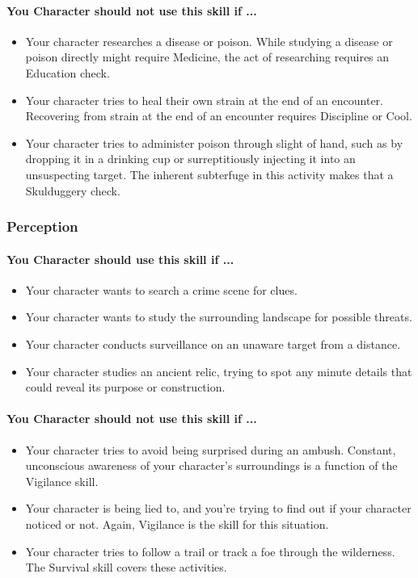 \begin{multicols}{2}
\paragraph{You Character should not use this skill if ...}
\begin{itemize}
    \item Your character researches a disease or poison. While studying a disease
        or poison directly might require Medicine, the act of researching requires
        an Education check.
    \item Your character tries to heal their own strain at the end of an encounter.
        Recovering from strain at the end of an encounter requires Discipline or Cool.
    \item Your character tries to administer poison through slight of hand, such
        as by dropping it in a drinking cup or surreptitiously injecting it into
        an unsuspecting target. The inherent subterfuge in this activity makes
        that a Skulduggery check.
\end{itemize}

\subsubsection{Perception}\label{skill:perception}
\paragraph{You Character should use this skill if ...}
\begin{itemize}
    \item Your character wants to search a crime scene for clues.
    \item Your character wants to study the surrounding landscape for possible
        threats.
    \item Your character conducts surveillance on an unaware target from a
        distance.
    \item Your character studies an ancient relic, trying to spot any minute details
        that could reveal its purpose or construction.
\end{itemize}
\paragraph{You Character should not use this skill if ...}
\begin{itemize}
    \item Your character tries to avoid being surprised during an ambush. Constant,
        unconscious awareness of your character's surroundings is a function of
        the Vigilance skill.
    \item Your character is being lied to, and you're trying to find out if your
        character noticed or not. Again, Vigilance is the skill for this situation.
    \item Your character tries to follow a trail or track a foe through the
        wilderness. The Survival skill covers these activities.
\end{itemize}


\end{multicols}
